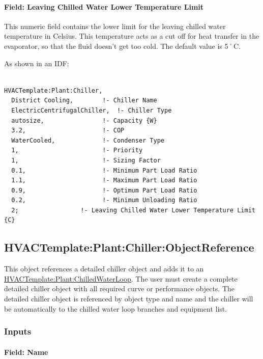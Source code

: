 \paragraph{Field: Leaving Chilled Water Lower Temperature Limit}\label{field-leaving-chilled-water-lower-temperature-limit}

This numeric field contains the lower limit for the leaving chilled water temperature in Celsius. This temperature acts as a cut off for heat transfer in the evaporator, so that the fluid doesn't get too cold. The default value is 5˚C.

As shown in an IDF:

\begin{lstlisting}

HVACTemplate:Plant:Chiller,
  District Cooling,        !- Chiller Name
  ElectricCentrifugalChiller,  !- Chiller Type
  autosize,                !- Capacity {W}
  3.2,                     !- COP
  WaterCooled,             !- Condenser Type
  1,                       !- Priority
  1,                       !- Sizing Factor
  0.1,                     !- Minimum Part Load Ratio
  1.1,                     !- Maximum Part Load Ratio
  0.9,                     !- Optimum Part Load Ratio
  0.2,                     !- Minimum Unloading Ratio
  2;                 !- Leaving Chilled Water Lower Temperature Limit {C}
\end{lstlisting}

\subsection{HVACTemplate:Plant:Chiller:ObjectReference}\label{hvactemplateplantchillerobjectreference}

This object references a detailed chiller object and adds it to an \hyperref[hvactemplateplantchilledwaterloop]{HVACTemplate:Plant:ChilledWaterLoop}. The user must create a complete detailed chiller object with all required curve or performance objects. The detailed chiller object is referenced by object type and name and the chiller will be automatically to the chilled water loop branches and equipment list.

\subsubsection{Inputs}\label{inputs-25-000}

\paragraph{Field: Name}\label{field-name-12-004}

